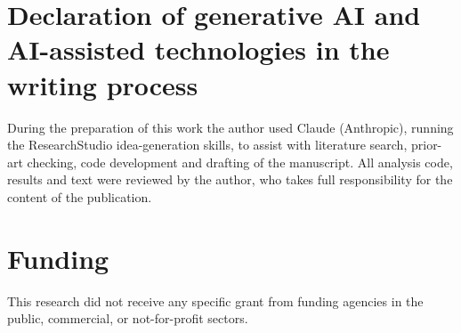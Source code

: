 \documentclass[preprint,12pt,authoryear]{elsarticle}
\begin{document}
\section*{Declaration of generative AI and AI-assisted technologies in the writing process}
During the preparation of this work the author used Claude (Anthropic), running the ResearchStudio idea-generation skills, to assist with literature search, prior-art checking, code development and drafting of the manuscript. All analysis code, results and text were reviewed by the author, who takes full responsibility for the content of the publication.

\section*{Funding}
This research did not receive any specific grant from funding agencies in the public, commercial, or not-for-profit sectors.



\end{document}
